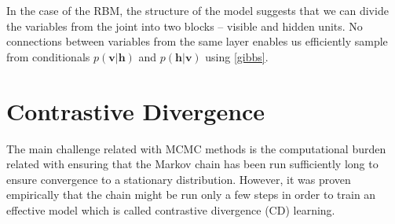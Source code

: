 In the case of the RBM, the structure of the model suggests that we can divide the variables from the joint into two blocks -- visible and hidden units. No connections between variables from the same layer enables us efficiently sample from conditionals $p(\mathbf{v}| \mathbf{h})$ and $p(\mathbf{h} | \mathbf{v})$ using \ref{gibbs}.
    
\section{Contrastive Divergence}
The main challenge related with MCMC methods is the computational burden related with ensuring that the Markov chain has been run sufficiently long to ensure convergence to a stationary distribution. However, it was proven empirically that the chain might be run only a few steps in order to train an effective model \cite{hinton2002training} which is called contrastive divergence (CD) learning. 
 

